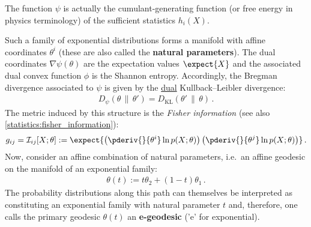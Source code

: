    \begin{remark}
        The function $\psi$ is actually the cumulant-generating function (or free energy in physics terminology) of the sufficient statistics $h_i(X)$.
    \end{remark}

    Such a family of exponential distributions forms a manifold with affine coordinates $\theta^i$ (these are also called the \textbf{natural parameters}). The dual coordinates $\nabla\psi(\theta)$ are the expectation values $\expect{X}$ and the associated dual convex function $\phi$ is the Shannon entropy. Accordingly, the Bregman divergence associated to $\psi$ is given by the \underline{dual} Kullback--Leibler divergence:
    \begin{gather}
        \label{info:KL_reversal}
        D_\psi(\theta\,\|\,\theta') = D_{\text{KL}}(\theta'\,\|\,\theta)\,.
    \end{gather}
    The metric induced by this structure is the \textit{Fisher information} (see also \cref{statistics:fisher_information}):
    \begin{gather}
        g_{ij} = \mathcal{I}_{ij}[X;\theta] := \expect{\left(\pderiv{}{\theta^i}\ln p(X;\theta)\right)\left(\pderiv{}{\theta^j}\ln p(X;\theta)\right)}\,.
    \end{gather}
    Now, consider an affine combination of natural parameters, i.e.~an affine geodesic on the manifold of an exponential family:
    \begin{gather}
        \theta(t) := t\theta_2 + (1-t)\theta_1\,.
    \end{gather}
    The probability distributions along this path can themselves be interpreted as constituting an exponential family with natural parameter $t$ and, therefore, one calls the primary geodesic $\theta(t)$ an \textbf{e-geodesic} ('e' for exponential).

